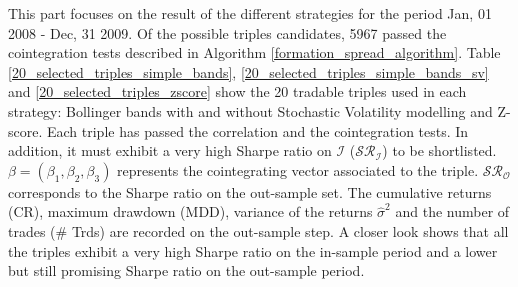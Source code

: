 \documentclass[11pt,a4,twosided,singlespacing,titlepagenumber=on]{scrreprt}
\numberwithin{equation}{chapter} %
\theoremstyle{remark}
\begin{document}
This part focuses on the result of the different strategies for the period Jan, 01 2008 - Dec, 31 2009. Of the possible triples candidates, 5967 passed the cointegration tests described in Algorithm \ref{formation_spread_algorithm}. Table \ref{20_selected_triples_simple_bands}, \ref{20_selected_triples_simple_bands_sv} and \ref{20_selected_triples_zscore} show the 20 tradable triples used in each strategy: Bollinger bands with and without Stochastic Volatility modelling and Z-score. Each triple has passed the correlation and the cointegration tests. In addition, it must exhibit a very high Sharpe ratio on $\mathcal{I}$ ($\mathcal{SR}_\mathcal{I}$) to be shortlisted. $\beta = (\beta_1, \beta_2, \beta_3)$ represents the cointegrating vector associated to the triple. $\mathcal{SR}_\mathcal{O}$ corresponds to the Sharpe ratio on the out-sample set. The cumulative returns (CR), maximum drawdown (MDD), variance of the returns $\hat{\sigma}^2$ and the number of trades (\# Trds) are recorded on the out-sample step. A closer look shows that all the triples exhibit a very high Sharpe ratio on the in-sample period and a lower but still promising Sharpe ratio on the out-sample period. 
\end{document}
